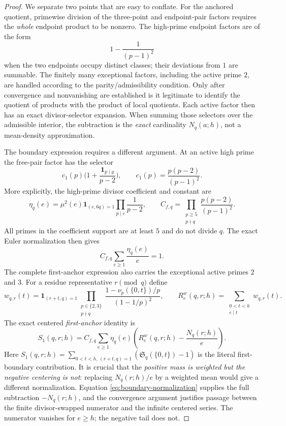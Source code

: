 \documentclass[11pt]{article}
\theoremstyle{definition}
\theoremstyle{remark}
\newcommand{\SSer}{\mathfrak S}
\newcommand{\1}{\mathbf 1}
\newcommand{\e}{\mathrm e}
\begin{document}
\begin{proof}
We separate two points that are easy to conflate. For the anchored
quotient, primewise division of the three-point and endpoint-pair
factors requires the \emph{whole} endpoint product to be nonzero.
The high-prime endpoint factors are of the form
\[
 1-\frac{1}{(p-1)^2}
\]
when the two endpoints occupy distinct classes; their deviations from
$1$ are summable. The finitely many exceptional factors, including the
active prime $2$, are handled according to the parity/admissibility
condition. Only after convergence and nonvanishing are established is
it legitimate to identify the quotient of products with the product of
local quotients. Each active factor then has an exact divisor-selector
expansion. When summing those selectors over the admissible interior,
the subtraction is the \emph{exact} cardinality $N_q(a;h)$, not a
mean-density approximation.

The boundary expression requires a different argument. At an active
high prime the free-pair factor has the selector
\[
 c_1(p)\bigg(1+\frac{\mathbf1_{p\mid y}}{p-2}\bigg),
 \qquad c_1(p)=\frac{p(p-2)}{(p-1)^2}.
\]
More explicitly, the high-prime divisor coefficient and constant are
\[
 \eta_q(e)=\mu^2(e)\mathbf1_{(e,6q)=1}
       \prod_{p\mid e}\frac1{p-2},\qquad
 C_{f,q}=\prod_{\substack{p\ge5\\p\nmid q}}
       \frac{p(p-2)}{(p-1)^2}.
\]
All primes in the coefficient support are at least $5$ and do not
divide $q$. The exact Euler normalization then gives
\begin{equation}\label{eq:boundary-normalization}
 C_{f,q}\sum_{e\ge1}\frac{\eta_q(e)}{e}=1.
\end{equation}
The complete first-anchor expression also carries the exceptional active
primes $2$ and $3$. For a residue representative $r\pmod q$ define
\begin{equation}\label{eq:free-low-weight}
 w_{q,r}(t)=\mathbf1_{(r+t,q)=1}
 \prod_{\substack{p\in\{2,3\}\\p\nmid q}}
 \frac{1-\nu_p(\{0,t\})/p}{(1-1/p)^2},
 \qquad
 R^{w}_e(q,r;h)=\sum_{\substack{0<t<h\\e\mid t}}w_{q,r}(t).
\end{equation}
The exact centered \emph{first-anchor} identity is
\begin{equation}\label{eq:boundary-infinite-tail}
 \boxed{S_1(q,r;h)=C_{f,q}\sum_{e\ge1}\eta_q(e)
     \left(R^w_e(q,r;h)-\frac{N_q(r;h)}e\right).}
\end{equation}
Here $S_1(q,r;h)=\sum_{0<t<h,\,(r+t,q)=1}
(\SSer_q(\{0,t\})-1)$ is the literal first-boundary contribution.
It is crucial that the \emph{positive mass is weighted but the
negative centering is not}: replacing $N_q(r;h)/e$ by a weighted
mean would give a different normalization. Equation
\eqref{eq:boundary-normalization} supplies the full subtraction
$-N_q(r;h)$, and the convergence argument justifies passage between
the finite divisor-swapped numerator and the infinite centered series.
The numerator vanishes for $e\ge h$; the negative tail does not.


\end{proof}
\end{document}
